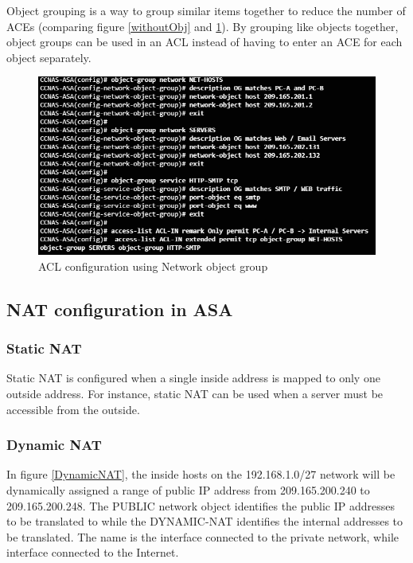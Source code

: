 Object grouping is a way to group similar items together to reduce the number of ACEs (comparing figure \ref{withoutObj} and \ref{withObj}). By grouping like objects together, object groups can be used in an ACL instead of having to enter an ACE for each object separately. 

\begin{figure}[hbtp]
\caption{ACL configuration using Network object group}\label{withObj}
\centering
\includegraphics[scale=0.7]{pictures/withObj.PNG}
\end{figure}

\subsection{NAT configuration in ASA}

\subsubsection{Static NAT}

Static NAT is configured when a single inside address is mapped to only one outside address. For instance, static NAT can be used when a server must be accessible from the outside.

\subsubsection{Dynamic NAT}

In figure \ref{DynamicNAT}, the inside hosts on the 192.168.1.0/27 network will be dynamically assigned a range of public IP address from 209.165.200.240 to 209.165.200.248. The PUBLIC network object identifies the public IP addresses to be translated to while the DYNAMIC-NAT identifies the internal addresses to be translated. The name  is the interface connected to the private network, while  interface connected to the Internet.\\

